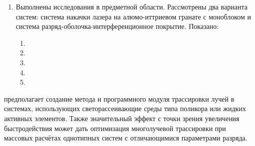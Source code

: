 \begin{enumerate}
	\item Выполнены исследования в предметной области.
	Рассмотрены два варианта систем: система накачки лазера на алюмо-иттриевом гранате с моноблоком и система разряд-оболочка-интерференционное покрытие.
	Показано:
	\begin{enumerate}
		\item
		\item
		\item
		\item
		\item
	\end{enumerate}
\end{enumerate}

 предполагает создание  метода и программного модуля трассировки лучей в системах, использующих светорассеивающие среды типа поликора или жидких активных элементов.
Также значительный эффект с точки зрения увеличения быстродействия может дать оптимизация многолучевой трассировки при массовых расчётах однотипных систем с отличающимися параметрами разряда.
